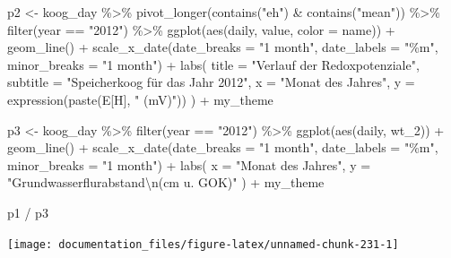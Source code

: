\documentclass[
]{article}
\newenvironment{Shaded}{\begin{snugshade}}{\end{snugshade}}
\newcommand{\AttributeTok}[1]{\textcolor[rgb]{0.77,0.63,0.00}{#1}}
\newcommand{\FunctionTok}[1]{\textcolor[rgb]{0.00,0.00,0.00}{#1}}
\newcommand{\NormalTok}[1]{#1}
\newcommand{\OtherTok}[1]{\textcolor[rgb]{0.56,0.35,0.01}{#1}}
\newcommand{\SpecialCharTok}[1]{\textcolor[rgb]{0.00,0.00,0.00}{#1}}
\newcommand{\StringTok}[1]{\textcolor[rgb]{0.31,0.60,0.02}{#1}}
\begin{document}
\begin{Shaded}
\begin{Highlighting}[]
\NormalTok{p2 }\OtherTok{\textless{}{-}}\NormalTok{ koog\_day }\SpecialCharTok{\%\textgreater{}\%}
  \FunctionTok{pivot\_longer}\NormalTok{(}\FunctionTok{contains}\NormalTok{(}\StringTok{"eh"}\NormalTok{) }\SpecialCharTok{\&} \FunctionTok{contains}\NormalTok{(}\StringTok{"mean"}\NormalTok{)) }\SpecialCharTok{\%\textgreater{}\%}
  \FunctionTok{filter}\NormalTok{(year }\SpecialCharTok{==} \StringTok{"2012"}\NormalTok{) }\SpecialCharTok{\%\textgreater{}\%}
  \FunctionTok{ggplot}\NormalTok{(}\FunctionTok{aes}\NormalTok{(daily, value, }\AttributeTok{color =}\NormalTok{ name)) }\SpecialCharTok{+}
  \FunctionTok{geom\_line}\NormalTok{()  }\SpecialCharTok{+}
  \FunctionTok{scale\_x\_date}\NormalTok{(}\AttributeTok{date\_breaks =} \StringTok{"1 month"}\NormalTok{, }\AttributeTok{date\_labels =} \StringTok{"\%m"}\NormalTok{, }\AttributeTok{minor\_breaks =} \StringTok{"1 month"}\NormalTok{) }\SpecialCharTok{+}
  \FunctionTok{labs}\NormalTok{(}
    \AttributeTok{title =} \StringTok{"Verlauf der Redoxpotenziale"}\NormalTok{,}
    \AttributeTok{subtitle =} \StringTok{"Speicherkoog für das Jahr 2012"}\NormalTok{,}
    \AttributeTok{x =} \StringTok{"Monat des Jahres"}\NormalTok{,}
    \AttributeTok{y =} \FunctionTok{expression}\NormalTok{(}\FunctionTok{paste}\NormalTok{(E[H], }\StringTok{" (mV)"}\NormalTok{))}
\NormalTok{  ) }\SpecialCharTok{+} 
\NormalTok{  my\_theme}

\NormalTok{p3 }\OtherTok{\textless{}{-}}\NormalTok{ koog\_day }\SpecialCharTok{\%\textgreater{}\%}
  \FunctionTok{filter}\NormalTok{(year }\SpecialCharTok{==} \StringTok{"2012"}\NormalTok{) }\SpecialCharTok{\%\textgreater{}\%}
  \FunctionTok{ggplot}\NormalTok{(}\FunctionTok{aes}\NormalTok{(daily, wt\_2)) }\SpecialCharTok{+}
  \FunctionTok{geom\_line}\NormalTok{() }\SpecialCharTok{+}
  \FunctionTok{scale\_x\_date}\NormalTok{(}\AttributeTok{date\_breaks =} \StringTok{"1 month"}\NormalTok{, }\AttributeTok{date\_labels =} \StringTok{"\%m"}\NormalTok{, }\AttributeTok{minor\_breaks =} \StringTok{"1 month"}\NormalTok{) }\SpecialCharTok{+}
  \FunctionTok{labs}\NormalTok{(}
    \AttributeTok{x =} \StringTok{"Monat des Jahres"}\NormalTok{,}
    \AttributeTok{y =} \StringTok{"Grundwasserflurabstand}\SpecialCharTok{\textbackslash{}n}\StringTok{(cm u. GOK)"}
\NormalTok{  ) }\SpecialCharTok{+} 
\NormalTok{  my\_theme}

\NormalTok{p1 }\SpecialCharTok{/}\NormalTok{ p3  }
\end{Highlighting}
\end{Shaded}

\begin{center}\texttt{[image: documentation\_files/figure-latex/unnamed-chunk-231-1]} \end{center}
\end{document}
